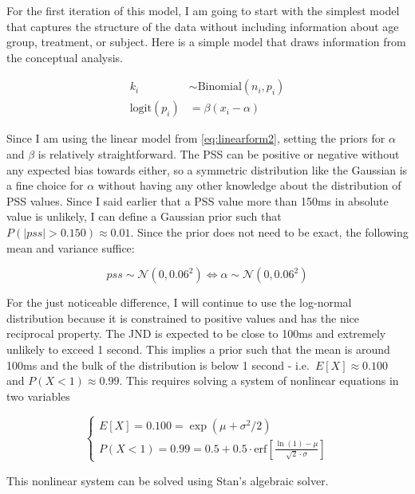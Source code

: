 \documentclass[11pt, oneside, openany]{scrbook}
\begin{document}
For the first iteration of this model, I am going to start with the simplest model that captures the structure of the data without including information about age group, treatment, or subject. Here is a simple model that draws information from the conceptual analysis.


\begin{align*}
  k_i &\sim \mathrm{Binomial}(n_i, p_i) \\
  \mathrm{logit}(p_i) &= \beta ( x_i - \alpha )
\end{align*}

Since I am using the linear model from \eqref{eq:linearform2}, setting the priors for \(\alpha\) and \(\beta\) is relatively straightforward. The PSS can be positive or negative without any expected bias towards either, so a symmetric distribution like the Gaussian is a fine choice for \(\alpha\) without having any other knowledge about the distribution of PSS values. Since I said earlier that a PSS value more than 150ms in absolute value is unlikely, I can define a Gaussian prior such that \(P(|pss| > 0.150) \approx 0.01\). Since the prior does not need to be exact, the following mean and variance suffice:


\[
pss \sim \mathcal{N}(0, 0.06^2) \Longleftrightarrow \alpha \sim \mathcal{N}(0, 0.06^2)
\]

For the just noticeable difference, I will continue to use the log-normal distribution because it is constrained to positive values and has the nice reciprocal property. The JND is expected to be close to 100ms and extremely unlikely to exceed 1 second. This implies a prior such that the mean is around 100ms and the bulk of the distribution is below 1 second - i.e.~\(E[X] \approx 0.100\) and \(P(X < 1) \approx 0.99\). This requires solving a system of nonlinear equations in two variables


\[
\begin{cases}
E[X] = 0.100 = \exp\left(\mu + \sigma^2 / 2\right) \\
P(X < 1) = 0.99 = 0.5 + 0.5 \cdot \mathrm{erf}\left[\frac{\ln (1) - \mu}{\sqrt{2} \cdot \sigma}\right]
\end{cases}
\]

This nonlinear system can be solved using Stan's algebraic solver.

\end{document}
